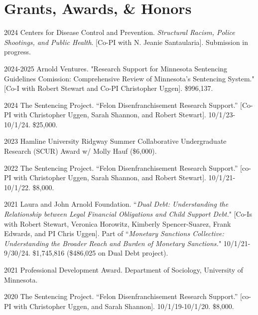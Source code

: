 \documentclass[letterpaper]{article}
\renewenvironment{itemize}{
  \begin{list}{}{
    \setlength{\leftmargin}{1.5em}
  }
}{
  \end{list}
}
\begin{document}
\section*{\textbf{Grants, Awards, \& Honors}}

\begin{itemize}

\item 2024 Centers for Disease Control and Prevention. \textit{Structural Racism, Police Shootings, and Public Health}. [Co-PI with N. Jeanie Santaularia]. Submission in progress. 

\item 2024-2025 Arnold Ventures. "Research Support for Minnesota Sentencing Guidelines Comission: Comprehensive Review of Minnesota's Sentencing System." [Co-I with Robert Stewart and Co-PI Christopher Uggen]. \$996,137. 

\item 2024 The Sentencing Project. “Felon Disenfranchisement Research Support.” [Co-PI with Christopher Uggen, Sarah Shannon, and Robert Stewart]. 10/1/23-10/1/24. \$25,000.

\item 2023 Hamline University Ridgway Summer Collaborative Undergraduate Research (SCUR) Award w/ Molly Hauf (\$6,000).

\item 2022 The Sentencing Project. “Felon Disenfranchisement Research Support.” [co-PI with Christopher Uggen, Sarah Shannon, and Robert Stewart]. 10/1/21-10/1/22. \$8,000.

\item 2021  Laura and John Arnold Foundation. ``\textit{Dual Debt: Understanding the Relationship between Legal Financial Obligations and Child Support Debt.}" [Co-Is with Robert Stewart, Veronica Horowitz, Kimberly Spencer-Suarez, Frank Edwards, and PI Chris Uggen]. Part of ``\textit{Monetary Sanctions Collective: Understanding the Broader Reach and Burden of Monetary Sanctions.}" 10/1/21-9/30/24. \$1,745,816 (\$486,025 on Dual Debt project).

\item 2021 Professional Development Award. Department of Sociology, University of Minnesota. 

\item 2020 The Sentencing Project. “Felon Disenfranchisement Research Support.” [co-PI with Christopher Uggen, and Sarah Shannon]. 10/1/19-10/1/20. \$8,000.


\end{itemize}
\end{document}
